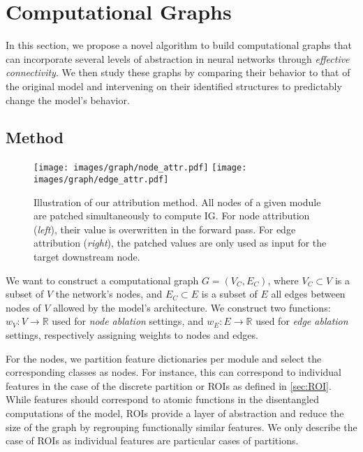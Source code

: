 \documentclass{article}
\newcommand{\R}{\mathbb{R}}
\begin{document}
\section{Computational Graphs}
\label{sec:computational_graphs}

In this section, we propose a novel algorithm to build computational graphs that can incorporate several levels of abstraction in neural networks through \textit{effective connectivity}. We then study these graphs by comparing their behavior to that of the original model and intervening on their identified structures to predictably change the model's behavior.

\subsection{Method}
\label{sec:effective_connectivity}


\begin{figure}[h]
    \hspace{-5em}
    \texttt{[image: images/graph/node\_attr.pdf]}
    \texttt{[image: images/graph/edge\_attr.pdf]}
    \caption{Illustration of our attribution method. All nodes of a given module are patched simultaneously to compute IG. For node attribution (\emph{left}), their value is overwritten in the forward pass. For edge attribution (\emph{right}), the patched values are only used as input for the target downstream node.}
    \label{fig:illustrated_method}
\end{figure}

We want to construct a computational graph $G = (V_C, E_C)$, where $V_C \subset V$ is a subset of $V$ the network's nodes, and $E_C \subset E$ is a subset of $E$ all edges between nodes of $V$ allowed by the model's architecture. We construct two functions: $w_V : V \rightarrow \R$ used for \emph{node ablation} settings, and $w_E : E \rightarrow \R$ used for \emph{edge ablation} settings, respectively assigning weights to nodes and edges.

For the nodes, we partition feature dictionaries per module and select the corresponding classes as nodes. For instance, this can correspond to individual features in the case of the discrete partition or ROIs as defined in \cref{sec:ROI}. While features should correspond to atomic functions in the disentangled computations of the model, ROIs provide a layer of abstraction and reduce the size of the graph by regrouping functionally similar features. We only describe the case of ROIs as individual features are particular cases of partitions.
\end{document}
